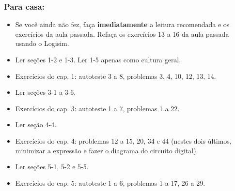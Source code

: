 \documentclass{beamer}
\begin{document}

\begin{frame}
\frametitle{Para casa:}

\begin{itemize}
\item Se você ainda não fez, faça \textbf{imediatamente} a leitura
recomendada e os exercícios da aula passada.
Refaça os exercícios 13 a 16 da aula passada usando o Logisim.
\item Ler seções 1-2 e 1-3. Ler 1-5 apenas como cultura geral.
\item Exercícios do cap. 1: autoteste 3 a 8, problemas 3, 4, 10, 12, 13, 14.
\item Ler seções 3-1 a 3-6.
\item Exercícios do cap. 3: autoteste 1 a 7, problemas 1 a 22.
\item Ler seção 4-4.
\item Exercícios do cap. 4: problemas 12 a 15, 20, 34 e 44 (nestes dois
últimos, minimizar a expressão e fazer o diagrama do circuito digital).
\item Ler seções 5-1, 5-2 e 5-5.
\item Exercícios do cap. 5: autoteste 1 a 6, problemas 1 a 17, 26 a 29.
\end{itemize}

\end{frame}
\end{document}
